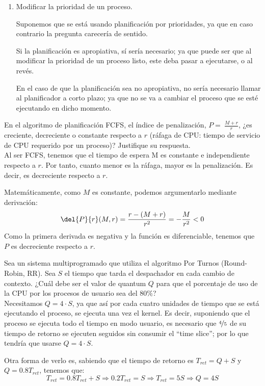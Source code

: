 \begin{ejercicio}
\begin{enumerate}
        \item  Modificar la prioridad de un proceso.

        Suponemos que se está usando planificación por prioridades, ya que en caso contrario la pregunta carecería de sentido.

        Si la planificación es apropiativa, sí sería necesario; ya que puede ser que al modificar la prioridad de un proceso listo, este deba pasar a ejecutarse, o al revés.
        
        En el caso de que la planificación sea no apropiativa, no sería necesario llamar al planificador a corto plazo; ya que no se va a cambiar el proceso que se esté ejecutando en dicho momento.
    \end{enumerate}
\end{ejercicio}

\begin{ejercicio}
    En el algoritmo de planificación FCFS, el índice de penalización, $P=~\frac{M+r}{r}$, ¿es creciente, decreciente o constante respecto a $r$ (ráfaga de CPU: tiempo de servicio de CPU requerido por un proceso)? Justifique su respuesta.\\

    Al ser FCFS, tenemos que el tiempo de espera M es constante e independiente respecto a $r$. Por tanto, cuanto menor es la ráfaga, mayor es la penalización. Es decir, es decreciente respecto a $r$.

    Matemáticamente, como $M$ es constante, podemos argumentarlo mediante derivación:
    \begin{equation*}
        \del{P}{r}(M,r) = \frac{r-(M+r)}{r^2}
        = -\frac{M}{r^2} < 0
    \end{equation*}
    Como la primera derivada es negativa y la función es diferenciable, tenemos que $P$ es decreciente respecto a $r$.
\end{ejercicio}

\begin{ejercicio}
    Sea un sistema multiprogramado que utiliza el algoritmo Por Turnos (Round-Robin, RR). Sea $S$ el tiempo que tarda el despachador en cada cambio de contexto. ¿Cuál debe ser el valor de quantum $Q$ para que el porcentaje de uso de la CPU por los procesos de usuario sea del 80\%?\\

    Necesitamos $Q=4\cdot S$, ya que así por cada cuatro unidades de tiempo que se está ejecutando el proceso, se ejecuta una vez el kernel. Es decir, suponiendo que el proceso se ejecuta todo el tiempo en modo usuario, es necesario que $\nicefrac{4}{5}$ de su tiempo de retorno se ejecuten seguidos sin consumir el ``time slice''; por lo que tendría que usarse $Q=4\cdot S$.

    Otra forma de verlo es, sabiendo que el tiempo de retorno es $T_{ret}=Q+S$ y $Q=0.8T_{ret}$, tenemos que:
    \begin{equation*}
        T_{ret}=0.8T_{ret}+S \Longrightarrow 0.2T_{ret} = S \Longrightarrow T_{ret}=5S \Longrightarrow Q=4S
    \end{equation*}
\end{ejercicio}

